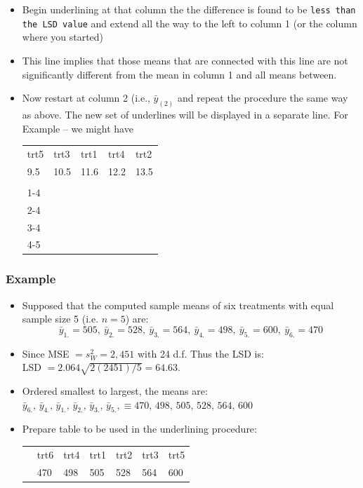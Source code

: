 \documentclass[xcolor=dvipsnames,12pt]{beamer}
\begin{document}
 
\begin{frame}
\begin{itemize} 
\item Begin underlining at that  column the the difference is found
to be {\tt less than the LSD value} and extend all the way 
to the left to column 1 (or the column where you started) 
\item This line 
implies that those means that are connected with this line are 
not  significantly different from the mean in column 1 and all means between.
\item Now restart at column 2 (i.e., $\bar{y}_{(2)}$ and repeat the procedure 
the same way as above. The new set of underlines will be displayed in a separate line.
 For Example -- we might have\\[.1in]
\hspace*{2in}\begin{tabular}{lllll}
       trt5 & trt3 & trt1 & trt4 & trt2 \\[.1in]
  9.5 & 10.5 & 11.6 & 12.2 & 13.5\\[-0.2in]
       \\ \cline{1-4}\\[.0001in]
        \cline{2-4}\\[.0002in]
        \cline{3-4}\\[.0003in]
        \cline{4-5}
       \end{tabular}
\end{itemize}
\end{frame}



\begin{frame}
\frametitle{Example}
\begin{itemize}
\item Supposed that the computed sample means of six treatments with equal
sample size 5 (i.e. $n=5$) are:\\[-.3in]
$$\bar{y}_{1.} = 505, \ \bar{y}_{2.} = 528, \ \bar{y}_{3.} = 564, \
\bar{y}_{4.} = 498, \ \bar{y}_{5.} = 600, \ \bar{y}_{6.} = 470
$$
\item Since MSE $=s^2_W=2,451$ with 24 d.f. Thus the LSD is: \\[.15in]
\hspace*{1.5in}LSD $=2.064\sqrt{2(2451)/5}=64.63$.
\item Ordered smallest to largest, the means are:\\[.1in]
$
 \bar{y}_{6.},\,\bar{y}_{4.},\,\bar{y}_{1.},\,\bar{y}_{2.},\,\bar{y}_{3.},\,\bar{y}_{5.},\equiv 470,\, 498,\, 505,\, 528,\, 564,\, 600
$
\item Prepare table to be used in the underlining procedure:
\begin{center}
\begin{tabular}{lllllll}
& trt6 & trt4 & trt1 & trt2 & trt3 & trt5 \\
&  470 & 498 & 505 & 528 & 564 & 600\\[.5in]
\end{tabular}
\end{center}
\end{itemize}
\end{frame}
\end{document}
